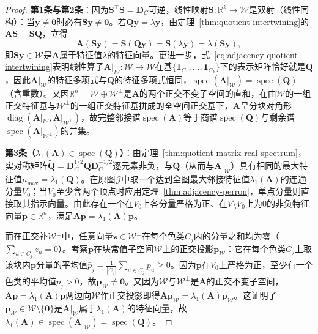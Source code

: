 \begin{proof}
\textbf{第1条与第2条}：因为$\bm S^\top\bm S=\bm D_C$可逆，线性映射$\bm S\colon\mathbb R^k\to\mathcal W$是双射（线性同构）：当$\bm y\neq\bm 0$时必有$\bm S\bm y\neq\bm 0$。若$\bm Q\bm y=\lambda\bm y$，由定理~\ref{thm:quotient-intertwining}的$\bm A\bm S=\bm S\bm Q$，立得
\[
\bm A(\bm S\bm y)=\bm S(\bm Q\bm y)=\bm S(\lambda\bm y)=\lambda(\bm S\bm y),
\]
即$\bm S\bm y\in\mathcal W$是$\bm A$属于特征值$\lambda$的特征向量。更进一步，式~\eqref{eq:adjacency-quotient-intertwining}表明线性算子$\bm A|_{\mathcal W}\colon\mathcal W\to\mathcal W$在基$\{\bm 1_{C_1},\ldots,\bm 1_{C_k}\}$下的表示矩阵恰好就是$\bm Q$，因此$\bm A|_{\mathcal W}$的特征多项式与$\bm Q$的特征多项式恒同，$\operatorname{spec}(\bm A|_{\mathcal W})=\operatorname{spec}(\bm Q)$（含重数）。又因$\mathbb R^n=\mathcal W\oplus\mathcal W^\perp$是$\bm A$的两个正交不变子空间的直和，在由$\mathcal W$的一组正交特征基与$\mathcal W^\perp$的一组正交特征基拼成的全空间正交基下，$\bm A$呈分块对角形$\operatorname{diag}(\bm A|_{\mathcal W},\bm A|_{\mathcal W^\perp})$，故完整邻接谱$\operatorname{spec}(\bm A)$等于商谱$\operatorname{spec}(\bm Q)$与剩余谱$\operatorname{spec}(\bm A|_{\mathcal W^\perp})$的并集。

\textbf{第3条（$\lambda_1(\bm A)\in\operatorname{spec}(\bm Q)$）}：由定理~\ref{thm:quotient-matrix-real-spectrum}，实对称矩阵$\widetilde{\bm Q}=\bm D_C^{1/2}\bm Q\bm D_C^{-1/2}$逐元素非负，与$\bm Q$（从而与$\bm A|_{\mathcal W}$）具有相同的最大特征值$\mu_{\max}=\lambda_1(\bm Q)$。在原图$\mathcal G$中取一个达到全图最大邻接特征值$\lambda_1(\bm A)$的连通分量$V_0$；当$V_0$至少含两个顶点时应用定理~\ref{thm:adjacency-perron}，单点分量则直接取其指示向量。由此存在一个在$V_0$上各分量严格为正、在$V\setminus V_0$上为$0$的非负特征向量$\bm p\in\mathbb R^n$，满足$\bm A\bm p=\lambda_1(\bm A)\bm p$。

而在正交补$\mathcal W^\perp$中，任意向量$\bm z\in\mathcal W^\perp$在每个色类$C_j$内的分量之和均为零（$\sum_{u\in C_j}z_u=0$）。考察$\bm p$在块常值子空间$\mathcal W$上的正交投影$\bm p_{\mathcal W}$：它在每个色类$C_j$上取该块内$\bm p$分量的平均值$\bar p_j=\frac{1}{|C_j|}\sum_{u\in C_j}p_u\geq 0$。因为$\bm p$在$V_0$上严格为正，至少有一个色类的平均值$\bar p_j>0$，故$\bm p_{\mathcal W}\neq\bm 0$。又因为$\mathcal W$与$\mathcal W^\perp$是$\bm A$的正交不变子空间，$\bm A\bm p=\lambda_1(\bm A)\bm p$两边向$\mathcal W$作正交投影即得$\bm A\bm p_{\mathcal W}=\lambda_1(\bm A)\bm p_{\mathcal W}$。这证明了$\bm p_{\mathcal W}\in\mathcal W\setminus\{\bm 0\}$是$\bm A|_{\mathcal W}$属于$\lambda_1(\bm A)$的特征向量，故$\lambda_1(\bm A)\in\operatorname{spec}(\bm A|_{\mathcal W})=\operatorname{spec}(\bm Q)$。
\end{proof}

